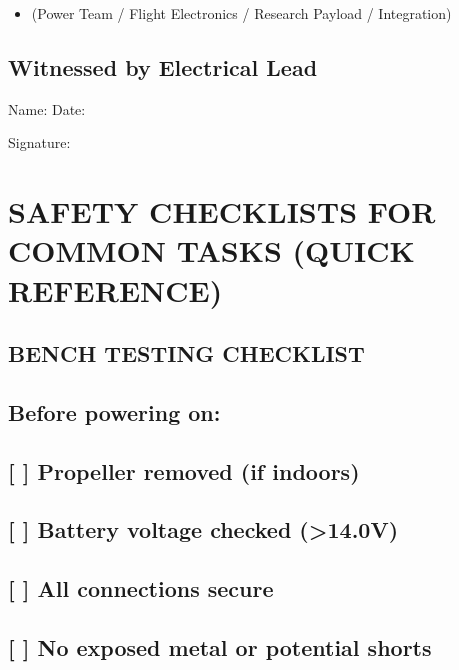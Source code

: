 \documentclass[11pt,letterpaper]{article}
\begin{document}
{{\begin{itemize}
  \item (Power Team / Flight Electronics / Research Payload / Integration)
\end{itemize}

\subsection{Witnessed by Electrical Lead}

Name:         \underline{\hspace{4.95cm}}     Date: \underline{\hspace{2.4cm}}\par

Signature:    \underline{\hspace{4.95cm}}\par

\section{SAFETY CHECKLISTS FOR COMMON TASKS (QUICK REFERENCE)}

\subsection*{BENCH TESTING CHECKLIST}

\subsection*{Before powering on:}

\subsection*{[ ] Propeller removed (if indoors)}

\subsection*{[ ] Battery voltage checked (>14.0V)}

\subsection*{[ ] All connections secure}

\subsection*{[ ] No exposed metal or potential shorts}

}}
\end{document}
